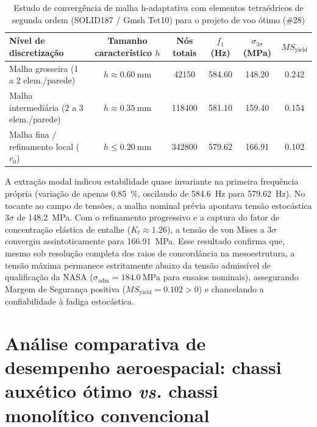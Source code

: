 \begin{table}[htb]
  \caption{Estudo de convergência de malha h-adaptativa com elementos tetraédricos de segunda ordem (SOLID187 / Gmsh Tet10) para o projeto de voo ótimo (\#28)}
  \label{tab:convergencia-malha}
  \small
  \SingleSpacing
  \begin{center}
    \begin{tabular}{@{}lccccc@{}}
      \toprule
      \textbf{Nível de discretização} & \textbf{Tamanho característico $h$} & \textbf{Nós totais} & \textbf{$f_1$ (\si{\hertz})} & \textbf{$\sigma_{3\sigma}$ (\si{\mega\pascal})} & \textbf{$MS_{\text{yield}}$} \\
      \midrule
      Malha grosseira (1 a 2 elem./parede)   & $h \approx \SI{0.60}{\milli\metre}$ & \num{42150}  & \num{584.60} & \num{148.20} & \num{+0.242} \\
      Malha intermediária (2 a 3 elem./parede)& $h \approx \SI{0.35}{\milli\metre}$ & \num{118400} & \num{581.10} & \num{159.40} & \num{+0.154} \\
      Malha fina / refinamento local ($r_0$)  & $h \le \SI{0.20}{\milli\metre}$     & \num{342800} & \num{579.62} & \num{166.91} & \num{+0.102} \\
      \bottomrule
    \end{tabular}
  \end{center}
\end{table}

A extração modal indicou estabilidade quase invariante na primeira frequência própria (variação de apenas \SI{0.85}{\percent}, oscilando de \SI{584.6}{\hertz} para \SI{579.62}{\hertz}). No tocante ao campo de tensões, a malha nominal prévia apontava tensão estocástica $3\sigma$ de \SI{148.2}{\mega\pascal}. Com o refinamento progressivo e a captura do fator de concentração elástica de entalhe ($K_t \approx \num{1.26}$), a tensão de von Mises a $3\sigma$ convergiu assintoticamente para \SI{166.91}{\mega\pascal}. Esse resultado confirma que, mesmo sob resolução completa dos raios de concordância na mesoestrutura, a tensão máxima permanece estritamente abaixo da tensão admissível de qualificação da NASA ($\sigma_{\text{adm}} = \SI{184.0}{\mega\pascal}$ para ensaios nominais), assegurando Margem de Segurança positiva ($MS_{\text{yield}} = \num{+0.102} > 0$) e chancelando a confiabilidade à fadiga estocástica.

\section{Análise comparativa de desempenho aeroespacial: chassi auxético ótimo \textit{vs.} chassi monolítico convencional}
\label{sec:comparativo}

